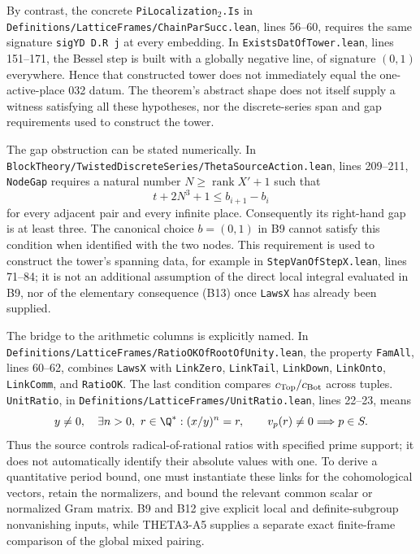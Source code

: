 By contrast, the concrete \texttt{PiLocalization$_2$.Is} in
\texttt{Definitions/\allowbreak{}LatticeFrames/\allowbreak{}ChainParSucc.lean}, lines 56--60, requires the same signature \texttt{sigYD D.R j} at every embedding. In \texttt{ExistsDatOfTower.lean}, lines 151--171, the Bessel step is built with a globally negative line, of signature $(0,1)$ everywhere. Hence that constructed tower does not immediately equal the one-active-place 032 datum. The theorem's abstract shape does not itself supply a witness satisfying all these hypotheses, nor the discrete-series span and gap requirements used to construct the tower.

The gap obstruction can be stated numerically. In \texttt{BlockTheory/\allowbreak{}TwistedDiscreteSeries/\allowbreak{}ThetaSourceAction.lean}, lines 209--211, \texttt{NodeGap} requires a natural number $N\geq\operatorname{rank}X'+1$ such that
\[
 t+2N^3+1\leq b_{i+1}-b_i
\]
for every adjacent pair and every infinite place. Consequently its right-hand gap is at least three. The canonical choice $b=(0,1)$ in B9 cannot satisfy this condition when identified with the two nodes. This requirement is used to construct the tower's spanning data, for example in \texttt{StepVanOfStepX.lean}, lines 71--84; it is not an additional assumption of the direct local integral evaluated in B9, nor of the elementary consequence (B13) once \texttt{LawsX} has already been supplied.

The bridge to the arithmetic columns is explicitly named. In
\texttt{Definitions/\allowbreak{}LatticeFrames/\allowbreak{}RatioOKOfRootOfUnity.lean}, the property
\texttt{FamAll}, lines 60--62, combines \texttt{LawsX} with
\texttt{LinkZero}, \texttt{LinkTail}, \texttt{LinkDown},
\texttt{LinkOnto}, \texttt{LinkComm}, and \texttt{RatioOK}.
The last condition compares $c_{\rm Top}/c_{\rm Bot}$ across tuples.
\texttt{UnitRatio}, in \texttt{Definitions/\allowbreak{}LatticeFrames/\allowbreak{}UnitRatio.lean}, lines 22--23, means
\[
 y\ne0,\quad \exists n>0,\ r\in\Q^*:
 (x/y)^n=r,
 \qquad v_p(r)\ne0\Longrightarrow p\in S.
\]
Thus the source controls radical-of-rational ratios with specified prime support; it does not automatically identify their absolute values with one. To derive a quantitative period bound, one must instantiate these links for the cohomological vectors, retain the normalizers, and bound the relevant common scalar or normalized Gram matrix. B9 and B12 give explicit local and definite-subgroup nonvanishing inputs, while THETA3-A5 supplies a separate exact finite-frame comparison of the global mixed pairing.

